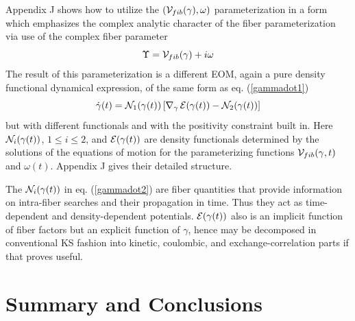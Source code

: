 Appendix J shows how to utilize the $\left( {\cal V}_{fib}(\gamma ),\omega
\right) $ parameterization in a form which emphasizes the complex analytic
character of the fiber parameterization via use of the complex fiber
parameter 
\begin{equation}
\Upsilon ={\cal V}_{fib}(\gamma )+i\omega  \label{Ffactor}
\end{equation}%
The result of this parameterization is a different EOM, again a pure density
functional dynamical expression, of the same form as eq. (\ref{gammadot1}) 
\begin{equation}
\dot{\gamma}(t)={\cal N}_{1}(\gamma (t))\left[ \nabla _{\gamma }\,{\cal E}%
(\gamma (t))-{\cal N}_{2}(\gamma (t))\right]  \label{gammadot2}
\end{equation}%
but with different functionals and with the positivity constraint built in.
Here ${\cal N}_{i}(\gamma (t))$, $1\leq i\leq 2$, and ${\cal E}(\gamma (t))$
are density functionals determined by the solutions of the equations of
motion for the parameterizing functions ${\cal V}_{fib}(\gamma ,t)$ and $%
\omega (t)$. Appendix J gives their detailed structure.

The ${\cal N}_{i}(\gamma (t))$ in eq. (\ref{gammadot2}) are fiber quantities
that provide information on intra-fiber searches and their propagation in
time. Thus they act as time-dependent and density-dependent potentials. $%
{\cal E}(\gamma (t))$ also is an implicit function of fiber factors but an
explicit function of $\gamma $, hence may be decomposed in conventional KS
fashion into kinetic, coulombic, and exchange-correlation parts if that
proves useful.

\section{Summary and Conclusions}

